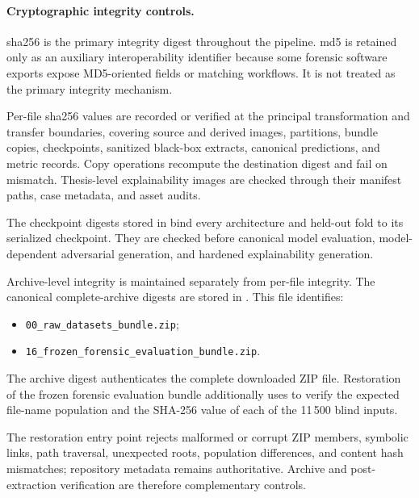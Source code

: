 \paragraph{Cryptographic integrity controls.}

\gls{sha256} is the primary integrity digest throughout the pipeline.
\gls{md5} is retained only as an auxiliary interoperability identifier because
some forensic software exports expose MD5-oriented fields or matching
workflows. It is not treated as the primary integrity mechanism.

Per-file \gls{sha256} values are recorded or verified at the principal
transformation and transfer boundaries, covering source and derived images,
partitions, bundle copies, checkpoints, sanitized black-box extracts, canonical
predictions, and metric records. Copy operations recompute the destination
digest and fail on mismatch. Thesis-level explainability images are checked
through their manifest paths, case metadata, and asset audits.

The checkpoint digests stored in
 bind every architecture and
held-out fold to its serialized checkpoint. They are checked before canonical
model evaluation, model-dependent adversarial generation, and hardened
explainability generation.

Archive-level integrity is maintained separately from per-file integrity. The
canonical complete-archive digests are stored in
. This file
identifies:

\begin{itemize}
\item \texttt{00\_raw\_datasets\_bundle.zip};
\item \texttt{16\_frozen\_forensic\_evaluation\_bundle.zip}.
\end{itemize}

The archive digest authenticates the complete downloaded ZIP file. Restoration
of the frozen forensic evaluation bundle additionally uses
 to verify the expected file-name population and the
SHA-256 value of each of the 11\,500 blind inputs.

The restoration entry point rejects malformed or corrupt ZIP members, symbolic
links, path traversal, unexpected roots, population differences, and content
hash mismatches; repository metadata remains authoritative. Archive and
post-extraction verification are therefore complementary controls.

